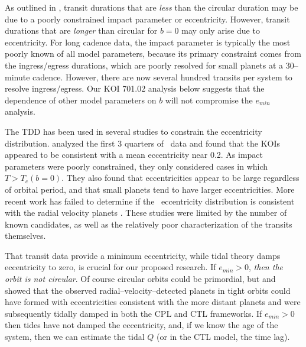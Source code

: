 As outlined in \cite{2008ApJ...678.1407F}, transit durations that are
{\it less} than the circular duration may be due to a poorly
constrained impact parameter or eccentricity.  However, transit
durations that are {\it longer} than circular for $b=0$ may only arise due to
eccentricity.  For long cadence \kepler data, the impact parameter is
typically the most poorly known of all model parameters, because its
primary constraint comes from the ingress/egress durations, which are
poorly resolved for small planets at a 30--minute cadence.  However,
there are now several hundred transits per system to resolve
ingress/egress.  Our KOI 701.02 analysis below suggests that the
dependence of other model parameters on $b$ will not compromise the
$e_{min}$ analysis.

The TDD has been used in several studies to
constrain the eccentricity distribution. \cite{Moorhead11} analyzed
the first 3 quarters of \kepler~data and found that the KOIs appeared
to be consistent with a mean eccentricity near 0.2. As impact
parameters were poorly constrained, they only considered cases in
which $T > T_c(b=0)$. They also found that eccentricities appear to be
large regardless of orbital period, and that small planets tend to
have larger eccentricities. More recent work has failed to determine
if the \kepler~eccentricity distribution is consistent with the radial
velocity planets \citep{Plavchan12,Kane12}. These studies were limited
by the number of known candidates, as well as the relatively poor
characterization of the transits themselves.

\medskip
{\centerline{}}
\smallskip

That transit data provide a minimum eccentricity, while tidal theory
damps eccentricity to zero, is crucial for our proposed research. If
$e_{min} > 0$, \textit{then the orbit is not circular}.  Of course
circular orbits could be primordial, but \cite{Jackson08}
and \cite{Matsumura10} showed that the observed
radial--velocity--detected planets in tight orbits could have formed
with eccentricities consistent with the more distant planets and were
subsequently tidally damped in both the CPL and CTL frameworks.  If
$e_{min} > 0$ then tides have not damped the eccentricity, and, if we
know the age of the system, then we can estimate the tidal $Q$ (or in
the CTL model, the time lag).

